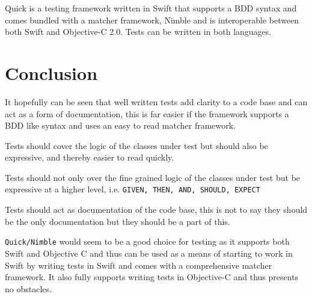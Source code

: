 \documentclass[a4paper, titlepage]{article}
\begin{document}
Quick is a testing framework written in Swift that supports a BDD syntax
and comes bundled with a matcher framework, Nimble and is interoperable
between both Swift and Objective-C 2.0. Tests can be written in both
languages.

\section{Conclusion}

  It hopefully can be seen that well written tests add clarity to a code
  base and can act as a form of documentation, this is far easier if the
  framework supports a BDD like syntax and uses an easy to read matcher
  framework.

  Tests should cover the logic of the classes under test but should
  also be expressive, and thereby easier to read quickly.

  Tests should not only over the fine grained logic of the classes under
  test but be expressive at a higher level, i.e. \texttt{GIVEN, THEN,
  AND, SHOULD, EXPECT}

  Tests should act as documentation of the code base, this is not to say
  they should be the only documentation but they should be a part of
  this.

  \texttt{Quick/Nimble} would seem to be a good choice for testing as it
  supports both Swift and Objective C and thus can be used as a means of
  starting to work in Swift by writing tests in Swift and comes with a
  comprehensive matcher framework. It also fully supports writing tests
  in Objective-C and thus presents no obstacles.
\end{document}
